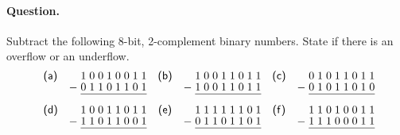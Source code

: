 \paragraph{Question.} Subtract the following 8-bit, 2-complement
binary numbers. State if there is an overflow or an underflow.
\[
\renewcommand\arraystretch{0.85}
\begin{array}{lr@{\;}c@{\;}c@{\;}c@{\;}c@{\;}c@{\;}c@{\;}c@{\;}c@{}lcr@{\;}c@{\;}c@{\;}c@{\;}c@{\;}c@{\;}c@{\;}c@{\;}c@{}lcr@{\;}c@{\;}c@{\;}c@{\;}c@{\;}c@{\;}c@{\;}c@{\;}c@{}}
\textsf{(a)} &   & 1&0&0&1&0&0&1&1 & & 
\textsf{(b)} &   & 1&0&0&1&1&0&1&1 & & 
\textsf{(c)} &   & 0&1&0&1&1&0&1&1\\
             & - & 0&1&1&0&1&1&0&1 & &
             & - & 1&0&0&1&1&0&1&1 & & 
             & - & 0&1&0&1&1&0&1&0\\
\cline{3-10}\cline{14-21}\cline{25-32}\\
\textsf{(d)} &   & 1&0&0&1&1&0&1&1 & & 
\textsf{(e)} &   & 1&1&1&1&1&1&0&1 & & 
\textsf{(f)} &   & 1&1&0&1&0&0&1&1\\
             & - & 1&1&0&1&1&0&0&1 & & 
             & - & 0&1&1&0&1&1&0&1 & &
             & - & 1&1&1&0&0&0&1&1\\
\cline{3-10}\cline{14-21}\cline{25-32}
\end{array}
\]
